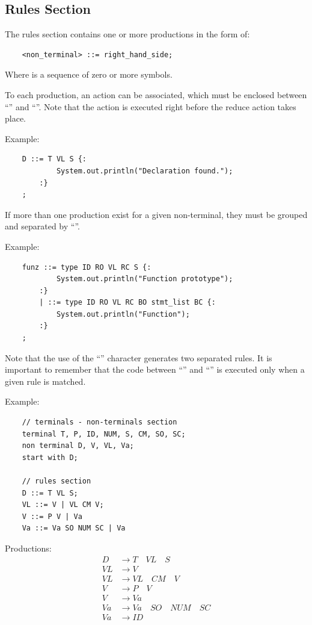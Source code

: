 \subsection{Rules Section}
The rules section contains one or more productions in the form of:
\begin{lstlisting}
	<non_terminal> ::= right_hand_side;
\end{lstlisting}
Where  is a sequence of zero or more symbols.

To each production, an action can be associated, which must be enclosed between ``\code{\{:}'' and ``\code{:\}}''.
Note that the action is executed right before the reduce action takes place.

Example:
\begin{lstlisting}
	D ::= T VL S {:
			System.out.println("Declaration found.");
		:}
	;
\end{lstlisting}

If more than one production exist for a given non-terminal, they must be grouped and separated by ``\code{\|}''.

Example:
\begin{lstlisting}
	funz ::= type ID RO VL RC S {:
			System.out.println("Function prototype");
		:}
		| ::= type ID RO VL RC BO stmt_list BC {:
			System.out.println("Function");
		:}
	;
\end{lstlisting}
Note that the use of the ``\code{\|}'' character generates two separated rules.
It is important to remember that the code between ``\code{\{:}'' and ``\code{:\}}'' is executed only when a given rule is matched.

Example:
\begin{lstlisting}
	// terminals - non-terminals section
	terminal T, P, ID, NUM, S, CM, SO, SC;
	non terminal D, V, VL, Va;
	start with D;

	// rules section
	D ::= T VL S;
	VL ::= V | VL CM V;
	V ::= P V | Va
	Va ::= Va SO NUM SC | Va
\end{lstlisting}
Productions:
\begin{align*}
	D &\to T \quad VL \quad S \\
	VL &\to V \\
	VL &\to VL \quad CM \quad V \\
	V &\to P \quad V \\
	V &\to Va \\
	Va &\to Va \quad SO \quad NUM \quad SC \\
	Va &\to ID
\end{align*}

